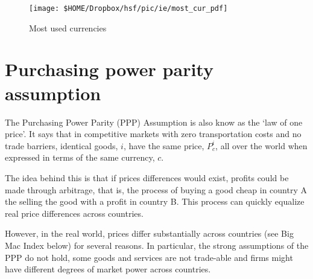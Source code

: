 \begin{figure}[H]
	\centering
	\texttt{[image: \$HOME/Dropbox/hsf/pic/ie/most\_cur\_pdf]}
	\caption{Most used currencies}
	\label{fig:most_cur}
\end{figure}

\pbn
\section{Purchasing power parity assumption}\label{sec:Purchasing power parity assumption}
The Purchasing Power Parity (PPP) Assumption is also know as the `law of one price'. It says that in competitive markets with zero transportation costs  and no trade barriers, identical goods, $i$, have the same price, $P^i_{c}$, all over the world when expressed in terms of the same currency, $c$.

The idea behind this is that if prices differences would exist, profits could be made through arbitrage, that is, the process of buying a good cheap in country A the selling the good with a profit in country B. This process can quickly equalize real price differences across countries.

However, in the real world, prices differ substantially across countries (see Big Mac Index below) for several reasons. In particular, the strong assumptions of the PPP do not hold, some goods and services are not trade-able and firms might have different degrees of market power across countries.


